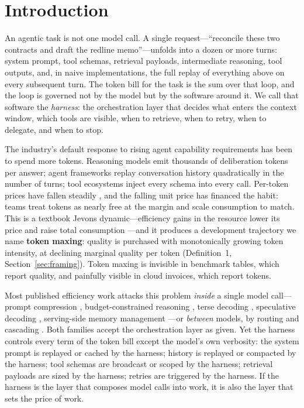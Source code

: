 \documentclass[11pt]{article}
\begin{document}
\section{Introduction}
\label{sec:intro}

An agentic task is not one model call. A single request---``reconcile these two contracts and draft the redline memo''---unfolds into a dozen or more turns: system prompt, tool schemas, retrieval payloads, intermediate reasoning, tool outputs, and, in naive implementations, the full replay of everything above on every subsequent turn. The token bill for the task is the sum over that loop, and the loop is governed not by the model but by the software around it. We call that software the \emph{harness}: the orchestration layer that decides what enters the context window, which tools are visible, when to retrieve, when to retry, when to delegate, and when to stop.

The industry's default response to rising agent capability requirements has been to spend more tokens. Reasoning models emit thousands of deliberation tokens per answer; agent frameworks replay conversation history quadratically in the number of turns; tool ecosystems inject every schema into every call. Per-token prices have fallen steadily \cite{epoch2025}, and the falling unit price has financed the habit: teams treat tokens as nearly free at the margin and scale consumption to match. This is a textbook Jevons dynamic---efficiency gains in the resource lower its price and raise total consumption \cite{jevons1865}---and it produces a development trajectory we name \textbf{token maxing}: quality is purchased with monotonically growing token intensity, at declining marginal quality per token (Definition~1, Section~\ref{sec:framing}). Token maxing is invisible in benchmark tables, which report quality, and painfully visible in cloud invoices, which report tokens.

Most published efficiency work attacks this problem \emph{inside} a single model call---prompt compression \cite{llmlingua}, budget-constrained reasoning \cite{tale}, terse decoding \cite{cod}, speculative decoding \cite{spec}, serving-side memory management \cite{vllm}---or \emph{between} models, by routing and cascading \cite{frugalgpt,routellm}. Both families accept the orchestration layer as given. Yet the harness controls every term of the token bill except the model's own verbosity: the system prompt is replayed or cached by the harness; history is replayed or compacted by the harness; tool schemas are broadcast or scoped by the harness; retrieval payloads are sized by the harness; retries are triggered by the harness. If the harness is the layer that composes model calls into work, it is also the layer that sets the price of work.
\end{document}
